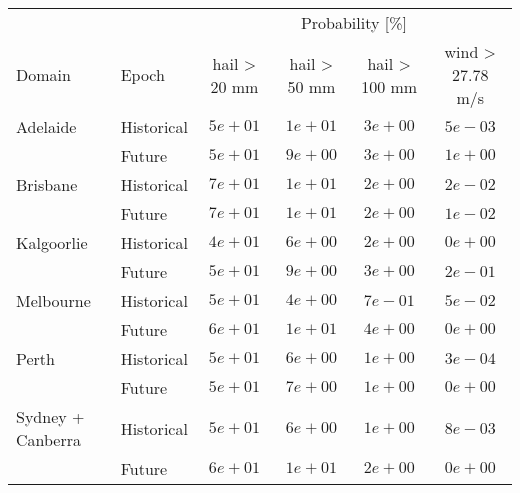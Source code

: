 \begin{tabular}{llcccc}
\hline
& & \multicolumn{4}{c}{Probability [\%]} \\ 
Domain & Epoch & hail > 20 mm & hail > 50 mm & hail > 100 mm & \multicolumn{1}{c}{wind > 27.78 m/s} \\ 
\hline
Adelaide & Historical  & $5e+01$ & $1e+01$ & $3e+00$ & $5e-03$ \\
 & Future  & $5e+01$ & $9e+00$ & $3e+00$ & $1e+00$ \\
Brisbane & Historical  & $7e+01$ & $1e+01$ & $2e+00$ & $2e-02$ \\
 & Future  & $7e+01$ & $1e+01$ & $2e+00$ & $1e-02$ \\
Kalgoorlie & Historical  & $4e+01$ & $6e+00$ & $2e+00$ & $0e+00$ \\
 & Future  & $5e+01$ & $9e+00$ & $3e+00$ & $2e-01$ \\
Melbourne & Historical  & $5e+01$ & $4e+00$ & $7e-01$ & $5e-02$ \\
 & Future  & $6e+01$ & $1e+01$ & $4e+00$ & $0e+00$ \\
Perth & Historical  & $5e+01$ & $6e+00$ & $1e+00$ & $3e-04$ \\
 & Future  & $5e+01$ & $7e+00$ & $1e+00$ & $0e+00$ \\
Sydney + Canberra & Historical  & $5e+01$ & $6e+00$ & $1e+00$ & $8e-03$ \\
 & Future  & $6e+01$ & $1e+01$ & $2e+00$ & $0e+00$ \\
\hline 
\end{tabular}

